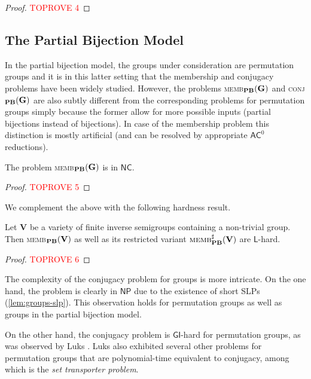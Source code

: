 \documentclass[anonymous,letter,UKenglish,cleveref,autoref,thm-restate]{lipics-v2021}
\newcommand{\ACz}{\ensuremath{\mathsf{AC}^0}\xspace}
\newcommand{\NC}{\ensuremath{\mathsf{NC}}\xspace}
\newcommand{\LOGSPACE}{\ensuremath{\mathsf{L}}\xspace}
\newcommand{\NP}{\ensuremath{\mathsf{NP}}\xspace}
\newcommand{\GI}{\ensuremath{\mathsf{GI}}}
\newcommand{\vV}{\ensuremath{\mathbf{V}}}
\newcommand{\vG}{\ensuremath{\mathbf{G}}}
\theoremstyle{plain}
\theoremstyle{plain}
\newcommand{\dMemb}[2][]{\textup{\textsc{memb${}_{\mathbf{#1}}\expandafter\ifx\expandafter\relax\detokenize{#2}\relax\else(#2)\fi$}}}
\newcommand{\dConj}[2][]{\textup{\textsc{conj${}_{\mathbf{#1}}\expandafter\ifx\expandafter\relax\detokenize{#2}\relax\else(#2)\fi$}}}
\newcommand{\dMembS}[2][]{\textup{\textsc{memb${}^{\sharp}_{\mathbf{#1}}\expandafter\ifx\expandafter\relax\detokenize{#2}\relax\else(#2)\fi$}}}
\begin{document}
\begin{proof}\textcolor{red}{TOPROVE 4}\end{proof}


\subsection{The Partial Bijection Model}\label{sub:groups-pbm}

In the partial bijection model, the groups under consideration are permutation groups and it is in this latter setting that the membership and conjugacy problems have been widely studied.
However, the problems \dMemb[PB]{\vG} and \dConj[PB]{\vG} are also subtly different from the corresponding problems for permutation groups simply because the former allow for more possible inputs (partial bijections instead of bijections). 
In case of the membership problem this distinction is mostly artificial (and can be  resolved by appropriate \ACz reductions).


\begin{proposition}\label{pro:pbm-groups-membership}
  The problem \dMemb[PB]{\vG} is in \NC{}.
\end{proposition}

\begin{proof}\textcolor{red}{TOPROVE 5}\end{proof}

We complement the above with the following hardness result.

\begin{proposition}\label{lem:nontrivial-group-hard}
	Let $\vV$ be a variety of finite inverse semigroups containing a non-trivial group.
	Then \dMemb[PB]{\vV} as well as its restricted variant $\dMembS[PB]{\vV}$ are \LOGSPACE-hard.
\end{proposition}
\begin{proof}\textcolor{red}{TOPROVE 6}\end{proof}


The complexity of the conjugacy problem for groups is more intricate.
On the one hand, the problem is clearly in \NP{} due to the existence of short SLPs (\cref{lem:groups-slp}).
This observation holds for permutation groups as well as groups in the partial bijection model.

On the other hand, the conjugacy problem is \GI-hard for permutation groups, as was observed by Luks \cite{Luks93}.
Luks also exhibited several other problems for permutation groups that are polynomial-time equivalent to conjugacy, among which is the \emph{set transporter problem}.
\end{document}
